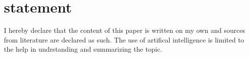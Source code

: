 \section{statement}
I hereby declare that the content of this paper is written on my own and sources from literature are declared as such. The use of artifical intelligence is limited to the help in undrstanding and summarizing the topic.
